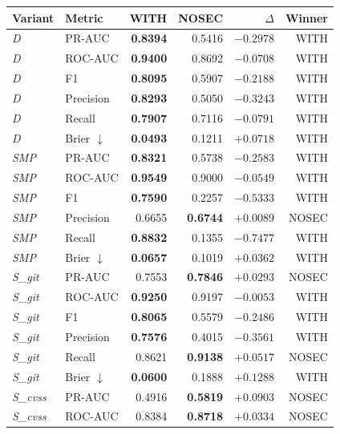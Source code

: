 \documentclass[11pt,a4paper]{article}
\begin{document}
\begin{table}[!htbp]
\centering\small
\setlength{\tabcolsep}{4.5pt}
\begin{tabular}{l l rr r r}
\toprule
Variant & Metric & WITH & NOSEC & $\Delta$ & Winner \\
\midrule
\emph{D} & PR-AUC    & \textbf{0.8394} & 0.5416 & $-0.2978$ & WITH  \\
\emph{D} & ROC-AUC   & \textbf{0.9400} & 0.8692 & $-0.0708$ & WITH  \\
\emph{D} & F1        & \textbf{0.8095} & 0.5907 & $-0.2188$ & WITH  \\
\emph{D} & Precision & \textbf{0.8293} & 0.5050 & $-0.3243$ & WITH  \\
\emph{D} & Recall    & \textbf{0.7907} & 0.7116 & $-0.0791$ & WITH  \\
\emph{D} & Brier $\downarrow$ & \textbf{0.0493} & 0.1211 & $+0.0718$ & WITH  \\
\midrule
\emph{SMP} & PR-AUC    & \textbf{0.8321} & 0.5738 & $-0.2583$ & WITH  \\
\emph{SMP} & ROC-AUC   & \textbf{0.9549} & 0.9000 & $-0.0549$ & WITH  \\
\emph{SMP} & F1        & \textbf{0.7590} & 0.2257 & $-0.5333$ & WITH  \\
\emph{SMP} & Precision & 0.6655          & \textbf{0.6744} & $+0.0089$ & NOSEC \\
\emph{SMP} & Recall    & \textbf{0.8832} & 0.1355 & $-0.7477$ & WITH  \\
\emph{SMP} & Brier $\downarrow$ & \textbf{0.0657} & 0.1019 & $+0.0362$ & WITH  \\
\midrule
\emph{S\_git} & PR-AUC    & 0.7553          & \textbf{0.7846} & $+0.0293$ & NOSEC \\
\emph{S\_git} & ROC-AUC   & \textbf{0.9250} & 0.9197 & $-0.0053$ & WITH  \\
\emph{S\_git} & F1        & \textbf{0.8065} & 0.5579 & $-0.2486$ & WITH  \\
\emph{S\_git} & Precision & \textbf{0.7576} & 0.4015 & $-0.3561$ & WITH  \\
\emph{S\_git} & Recall    & 0.8621          & \textbf{0.9138} & $+0.0517$ & NOSEC \\
\emph{S\_git} & Brier $\downarrow$ & \textbf{0.0600} & 0.1888 & $+0.1288$ & WITH  \\
\midrule
\emph{S\_cvss} & PR-AUC    & 0.4916 & \textbf{0.5819} & $+0.0903$ & NOSEC \\
\emph{S\_cvss} & ROC-AUC   & 0.8384 & \textbf{0.8718} & $+0.0334$ & NOSEC \\

\end{tabular}
\end{table}
\end{document}
